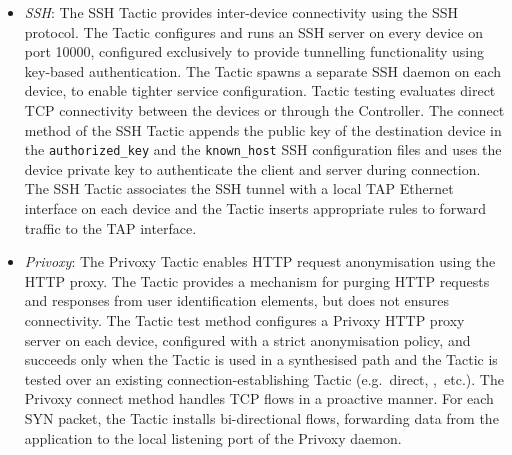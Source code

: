 \begin{itemize}
  \item \emph{SSH}:  The SSH Tactic provides inter-device connectivity using the SSH
    protocol. The Tactic configures and runs an SSH server on every \signpost
    device on port 10000, configured exclusively to provide tunnelling
    functionality using key-based authentication. The Tactic spawns a separate SSH
    daemon on each device, to enable tighter service configuration.  Tactic
    testing evaluates direct TCP connectivity between the devices or through the
    \signpost Controller.  The connect method of the SSH Tactic appends the
    public key of the destination device in the \texttt{authorized\_key} and the
    \texttt{known\_host} SSH configuration files and uses the device private key to
    authenticate the client and server during connection.  The SSH Tactic
    associates the SSH tunnel with a local TAP Ethernet interface on each device
    and the Tactic inserts appropriate \of rules to forward traffic to the TAP
    interface.

\item \emph{Privoxy}: The Privoxy Tactic enables HTTP request anonymisation
    using the~ HTTP proxy. The Tactic provides a mechanism
    for purging HTTP requests and responses from user identification elements, but
    does not ensures connectivity. The Tactic test method configures a
    Privoxy HTTP proxy server on each device, configured with a strict
    anonymisation policy, and succeeds only when the Tactic is used in a synthesised
    path and the Tactic is tested over an existing connection-establishing Tactic
    (e.g.~direct, \openvpn,~etc.). The Privoxy connect method handles TCP flows in a
    proactive manner.  For each SYN packet, the Tactic installs bi-directional
    flows, forwarding data from the application to the local listening port of the
    Privoxy daemon.


\end{itemize}
